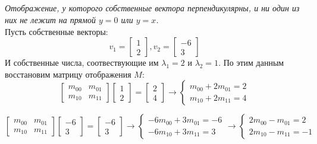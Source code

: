 \documentclass[a5paper, 10pt]{article}
\theoremstyle{definition}
\theoremstyle{plain}
\theoremstyle{remark}
\begin{document}
\subsection{}
\textit{Отображение, у которого собственные вектора перпендикулярны, и ни один из них не лежит на прямой $y=0$ или $y=x$.}\\
Пусть собственные векторы:
\begin{equation}
v_1 = 
\begin{bmatrix}
1\\
2
\end{bmatrix}
,
v_2 = 
\begin{bmatrix}
-6\\
3
\end{bmatrix}
\end{equation}
И собственные числа, соотвествующие им $\lambda_1 = 2$ и $\lambda_2 = 1$. По этим данным восстановим матрицу отображения $M$:
\begin{equation}
\begin{bmatrix}
m_{0 0} & m_{0 1}\\
m_{1 0} & m_{1 1}
\end{bmatrix}
\begin{bmatrix}
1\\
2
\end{bmatrix}
=
\begin{bmatrix}
2\\
4
\end{bmatrix}
\to
\begin{cases}
m_{0 0} + 2m_{0 1} = 2\\
m_{1 0} + 2m_{1 1} = 4
\end{cases}
\end{equation}

\begin{equation}
\begin{bmatrix}
m_{0 0} & m_{0 1}\\
m_{1 0} & m_{1 1}
\end{bmatrix}
\begin{bmatrix}
-6\\
3
\end{bmatrix}
=
\begin{bmatrix}
-6\\
3
\end{bmatrix}
\to
\begin{cases}
-6 m_{0 0} + 3m_{0 1} = -6\\
-6m_{1 0} + 3m_{1 1} = 3
\end{cases}
\to
\begin{cases}
2 m_{0 0} - m_{0 1} = 2\\
2m_{1 0} - m_{1 1} = -1
\end{cases}
\end{equation}
\end{document}
